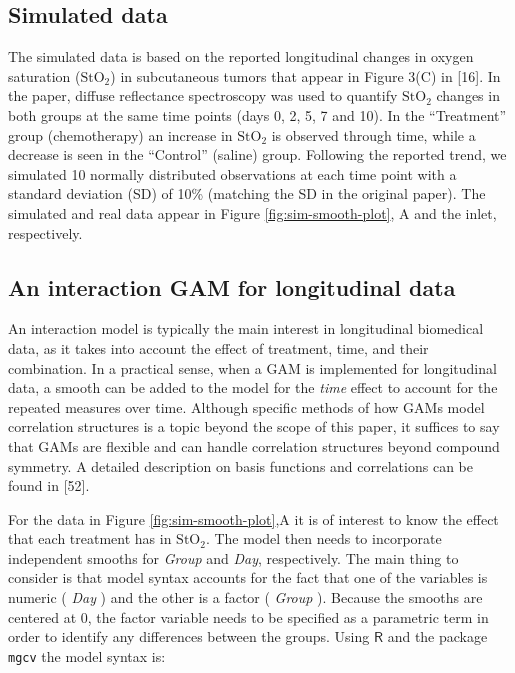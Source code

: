 \documentclass[
]{article}
\newcommand{\passthrough}[1]{#1}
\begin{document}
\hypertarget{simulated-data}{%
\subsection{Simulated data}\label{simulated-data}}

The simulated data is based on the reported longitudinal changes in oxygen saturation (\(\mbox{StO}_2\)) in subcutaneous tumors that appear in Figure 3(C) in {[}16{]}. In the paper, diffuse reflectance spectroscopy was used to quantify \(\mbox{StO}_2\) changes in both groups at the same time points (days 0, 2, 5, 7 and 10). In the ``Treatment'' group (chemotherapy) an increase in \(\mbox{StO}_2\) is observed through time, while a decrease is seen in the ``Control'' (saline) group. Following the reported trend, we simulated 10 normally distributed observations at each time point with a standard deviation (SD) of 10\% (matching the SD in the original paper).
The simulated and real data appear in Figure \ref{fig:sim-smooth-plot}, A and the inlet, respectively.

\hypertarget{an-interaction-gam-for-longitudinal-data}{%
\subsection{An interaction GAM for longitudinal data}\label{an-interaction-gam-for-longitudinal-data}}

An interaction model is typically the main interest in longitudinal biomedical data, as it takes into account the effect of treatment, time, and their combination. In a practical sense, when a GAM is implemented for longitudinal data, a smooth can be added to the model for the \emph{time} effect to account for the repeated measures over time. Although specific methods of how GAMs model correlation structures is a topic beyond the scope of this paper, it suffices to say that GAMs are flexible and can handle correlation structures beyond compound symmetry. A detailed description on basis functions and correlations can be found in {[}52{]}.

For the data in Figure \ref{fig:sim-smooth-plot},A it is of interest to know the effect that each treatment has in \(\mbox{StO}_2\). The model then needs to incorporate independent smooths for \emph{Group} and \emph{Day}, respectively. The main thing to consider is that model syntax accounts for the fact that one of the variables is numeric ( \emph{Day} ) and the other is a factor ( \emph{Group} ). Because the smooths are centered at 0, the factor variable needs to be specified as a parametric term in order to identify any differences between the groups. Using \(\textsf{R}\) and the package \passthrough{\lstinline!mgcv!} the model syntax is:
\end{document}
